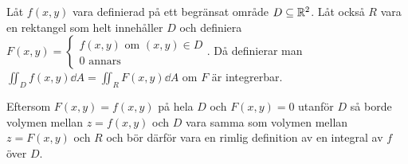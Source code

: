 \documentclass[a4paper]{article}
\begin{document}
\begin{defn}
    Låt \(
        f(x,y)
    \) vara definierad på ett begränsat område \(
        D \subseteq \mathbb{R}^2
    \). Låt också \(
        R
    \) vara en rektangel som helt innehåller \(
        D
    \) och definiera \(
        F(x,y) = \left\{ 
        \begin{matrix}
            f(x,y) \text{ om } (x,y) \in D \\ 
            0 \text{ annars}
        \end{matrix}\right.
    \). Då definierar man \(
        \iint_D f(x,y) \dd A = \iint_R F(x,y) \dd A
    \) om \(
        F
    \) är integrerbar.

    Eftersom \(
        F(x,y) = f(x,y)
    \) på hela \(
        D
    \) och \(
        F(x,y) = 0
    \) utanför \(
        D
    \) så borde volymen mellan \(
        z = f(x,y)
    \) och \(
        D
    \) vara samma som volymen mellan \(
        z = F(x,y)
    \) och \(
        R
    \) och bör därför vara en rimlig definition av en integral av \(
        f
    \) över \(
        D
    \).
\end{defn}
\end{document}
